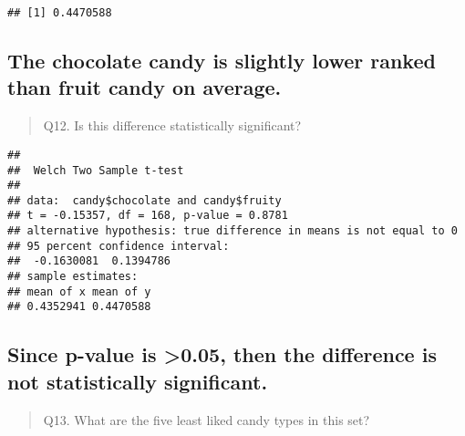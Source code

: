 \documentclass[
]{article}
\newenvironment{Shaded}{\begin{snugshade}}{\end{snugshade}}
\newcommand{\AttributeTok}[1]{\textcolor[rgb]{0.77,0.63,0.00}{#1}}
\newcommand{\CommentTok}[1]{\textcolor[rgb]{0.56,0.35,0.01}{\textit{#1}}}
\newcommand{\DecValTok}[1]{\textcolor[rgb]{0.00,0.00,0.81}{#1}}
\newcommand{\FunctionTok}[1]{\textcolor[rgb]{0.00,0.00,0.00}{#1}}
\newcommand{\NormalTok}[1]{#1}
\newcommand{\SpecialCharTok}[1]{\textcolor[rgb]{0.00,0.00,0.00}{#1}}
\begin{document}
\begin{verbatim}
## [1] 0.4470588
\end{verbatim}

\hypertarget{the-chocolate-candy-is-slightly-lower-ranked-than-fruit-candy-on-average.}{%
\subsection{The chocolate candy is slightly lower ranked than fruit
candy on
average.}\label{the-chocolate-candy-is-slightly-lower-ranked-than-fruit-candy-on-average.}}

\begin{quote}
Q12. Is this difference statistically significant?
\end{quote}

\begin{Shaded}
\end{Shaded}

\begin{verbatim}
## 
##  Welch Two Sample t-test
## 
## data:  candy$chocolate and candy$fruity
## t = -0.15357, df = 168, p-value = 0.8781
## alternative hypothesis: true difference in means is not equal to 0
## 95 percent confidence interval:
##  -0.1630081  0.1394786
## sample estimates:
## mean of x mean of y 
## 0.4352941 0.4470588
\end{verbatim}

\hypertarget{since-p-value-is-0.05-then-the-difference-is-not-statistically-significant.}{%
\subsection{Since p-value is \textgreater0.05, then the difference is
not statistically
significant.}\label{since-p-value-is-0.05-then-the-difference-is-not-statistically-significant.}}

\begin{quote}
Q13. What are the five least liked candy types in this set?
\end{quote}

\begin{Shaded}
\end{Shaded}
\end{document}
